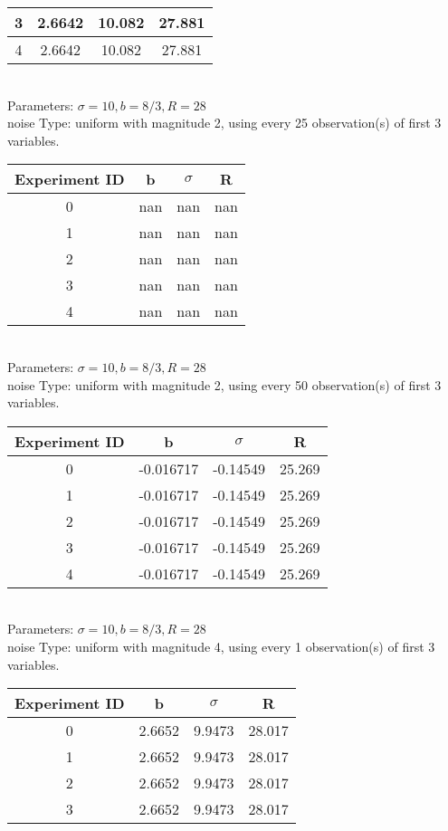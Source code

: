 \begin{multicols}{3}
\begin{tabular}{cccc}
 3 & 2.6642 & 10.082 & 27.881\\ \hline 
 4 & 2.6642 & 10.082 & 27.881\\ \hline 
 \end{tabular}\\
Parameters: $\sigma=10, b=8/3, R=28$\\
noise Type: uniform with magnitude 2, using every 25 observation(s) of first 3 variables.\\
\begin{tabular}{cccc}
\hline Experiment ID & b & $\sigma$ & R \\ \hline 
0 & nan & nan & nan\\ \hline 
 1 & nan & nan & nan\\ \hline 
 2 & nan & nan & nan\\ \hline 
 3 & nan & nan & nan\\ \hline 
 4 & nan & nan & nan\\ \hline 
 \end{tabular}\\
Parameters: $\sigma=10, b=8/3, R=28$\\
noise Type: uniform with magnitude 2, using every 50 observation(s) of first 3 variables.\\
\begin{tabular}{cccc}
\hline Experiment ID & b & $\sigma$ & R \\ \hline 
0 & -0.016717 & -0.14549 & 25.269\\ \hline 
 1 & -0.016717 & -0.14549 & 25.269\\ \hline 
 2 & -0.016717 & -0.14549 & 25.269\\ \hline 
 3 & -0.016717 & -0.14549 & 25.269\\ \hline 
 4 & -0.016717 & -0.14549 & 25.269\\ \hline 
 \end{tabular}\\
Parameters: $\sigma=10, b=8/3, R=28$\\
noise Type: uniform with magnitude 4, using every 1 observation(s) of first 3 variables.\\
\begin{tabular}{cccc}
\hline Experiment ID & b & $\sigma$ & R \\ \hline 
0 & 2.6652 & 9.9473 & 28.017\\ \hline 
 1 & 2.6652 & 9.9473 & 28.017\\ \hline 
 2 & 2.6652 & 9.9473 & 28.017\\ \hline 
 3 & 2.6652 & 9.9473 & 28.017\\ \hline 

\end{tabular}
\end{multicols}
